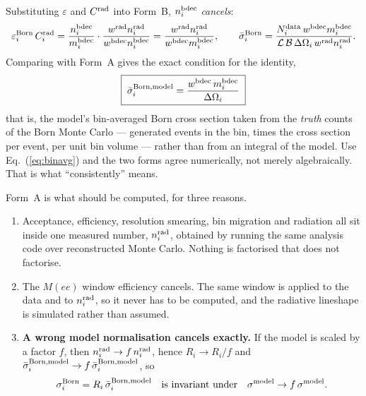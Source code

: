 \documentclass[11pt]{article}
\newcommand{\crad}{C^{\rm rad}}
\newcommand{\Lum}{\mathcal{L}}
\newcommand{\BR}{\mathcal{B}}
\begin{document}
Substituting $\varepsilon$ and $\crad$ into Form~B, $n_i^{\rm bdec}$ \emph{cancels}:
\begin{equation}
\varepsilon_i^{\rm Born}\,\crad_i
=\frac{n_i^{\rm bdec}}{m_i^{\rm bdec}}\cdot\frac{w^{\rm rad}n_i^{\rm rad}}{w^{\rm bdec}n_i^{\rm bdec}}
=\frac{w^{\rm rad}n_i^{\rm rad}}{w^{\rm bdec}m_i^{\rm bdec}},
\qquad
\bar\sigma_i^{\rm Born}=\frac{N_i^{\rm data}\,w^{\rm bdec}m_i^{\rm bdec}}
{\Lum\,\BR\,\Delta\Omega_i\,w^{\rm rad}n_i^{\rm rad}} .
\end{equation}
Comparing with Form~A gives the exact condition for the identity,
\begin{equation}
\boxed{\;\bar\sigma_i^{\rm Born,model}=\frac{w^{\rm bdec}\,m_i^{\rm bdec}}{\Delta\Omega_i}\;}
\label{eq:binavg}
\end{equation}
that is, the model's bin-averaged Born cross section taken from the \emph{truth} counts of the Born
Monte Carlo --- generated events in the bin, times the cross section per event, per unit bin volume
--- rather than from an integral of the model. Use Eq.~(\ref{eq:binavg}) and the two forms agree
numerically, not merely algebraically. That is what ``consistently'' means.

\medskip
Form~A is what should be computed, for three reasons.

\begin{enumerate}
\item Acceptance, efficiency, resolution smearing, bin migration and radiation all sit inside one
measured number, $n_i^{\rm rad}$, obtained by running the same analysis code over reconstructed
Monte Carlo. Nothing is factorised that does not factorise.

\item The $M(ee)$ window efficiency cancels. The same window is applied to the data and to
$n_i^{\rm rad}$, so it never has to be computed, and the radiative lineshape is simulated rather
than assumed.

\item \textbf{A wrong model normalisation cancels exactly.} If the model is scaled by a factor $f$,
then $n_i^{\rm rad}\to f\,n_i^{\rm rad}$, hence $R_i\to R_i/f$ and
$\bar\sigma_i^{\rm Born,model}\to f\,\bar\sigma_i^{\rm Born,model}$, so
\begin{equation}
\sigma_i^{\rm Born}=R_i\,\bar\sigma_i^{\rm Born,model}
\quad\text{is invariant under}\quad \sigma^{\rm model}\to f\,\sigma^{\rm model}.
\label{eq:invariance}
\end{equation}
\end{enumerate}
\end{document}
